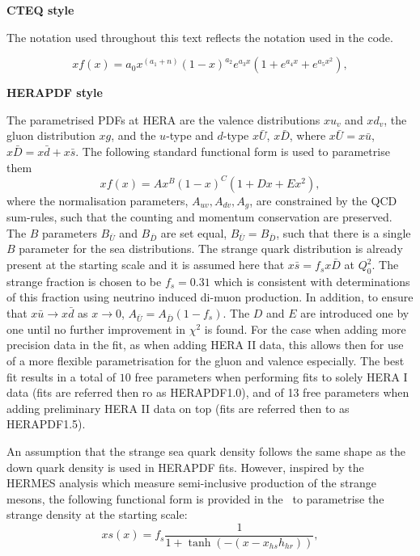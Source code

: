 \begin{description}
\item \bf{CTEQ style}\rm

The notation used throughout this text reflects the 
notation used in the code.

\begin{equation}
 xf(x) = a_0 x^{(a_1+n)} (1-x)^{a_2} e^{a_3x} (1 + e^{a_4 x} + e^{a_5 x^2}),
\label{eqn:pdf_cteq}
\end{equation}
%
\item \bf{HERAPDF style}\rm

 The parametrised PDFs at HERA are the valence distributions
 $xu_v$ and  $xd_v$,  the gluon distribution $xg$, and the $u$-type and $d$-type 
$x\bar{U}$, $x\bar{D}$, where $x\bar{U} = x\bar{u}$, 
$x\bar{D} = x\bar{d} +x\bar{s}$. 
The following standard functional form is used to parametrise them
\begin{equation}
 xf(x) = A x^{B} (1-x)^{C} (1 + D x + E x^2),
\label{eqn:pdf}
\end{equation}
%
where the normalisation parameters, $A_{uv}, A_{dv}, A_g$,  are constrained by  
the QCD sum-rules, such that the counting  and  momentum conservation are preserved.
The $B$ parameters  $B_{\bar{U}}$ and $B_{\bar{D}}$ are set equal,
 $B_{\bar{U}}=B_{\bar{D}}$, such that 
there is a single $B$ parameter for the sea distributions. 
%
The strange quark distribution 
is already present at the starting scale and 
%
it is  assumed here that 
$x\bar{s}= f_s  x\bar{D}$ at $Q^2_0$. 
The  strange fraction is chosen to be $f_s=0.31$ which is
consistent with determinations 
of this fraction using neutrino induced di-muon production. 
%
In addition, to ensure that $x\bar{u} \to x\bar{d}$ 
as $x \to 0$,  
$A_{\bar{U}}=A_{\bar{D}} (1-f_s)$.
%
The $D$ and $E$ are introduced one by one until no further improvement in $\chi^2$ is found.
For the case when adding more precision data in the fit, as when adding HERA II data, this allows then for use of a more flexible parametrisation for the gluon and valence especially.
The best fit  results in a total of $10$ free parameters when performing fits to solely HERA I data (fits are referred then ro as HERAPDF1.0), and of 13 free parameters when adding preliminary HERA II data on top (fits are referred then to as HERAPDF1.5).


An assumption that the strange sea quark density follows the same shape as the down quark density is used in HERAPDF fits. 
 However, inspired by the HERMES analysis \cite{hermes} which measure semi-inclusive production of the strange mesons, the following functional form is provided in the \fitter\ to parametrise the strange density  at the starting scale:
\begin{equation}
xs(x)=f_s\frac{1}{1+\tanh(-(x-x_{hs}h_{hr}))},
\end{equation}


\end{description}
